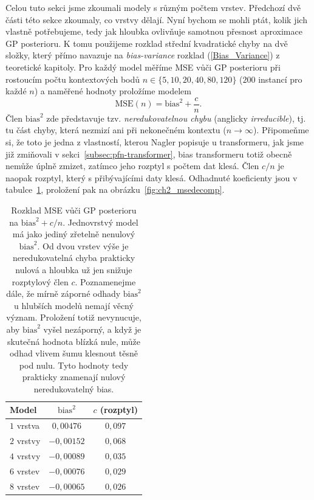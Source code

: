 Celou tuto sekci jsme zkoumali modely s různým počtem vrstev. 
Předchozí dvě části této sekce zkoumaly, co vrstvy dělají.
Nyní bychom se mohli ptát, kolik jich vlastně potřebujeme, tedy jak hloubka ovlivňuje samotnou přesnost aproximace GP posterioru.
K tomu použijeme rozklad střední kvadratické chyby na dvě složky, který přímo navazuje na \emph{bias-variance} rozklad (\ref{Bias_Variance}) z teoretické kapitoly.
Pro každý model měříme MSE vůči GP posterioru při rostoucím počtu kontextových bodů $n \in \{5, 10, 20, 40, 80, 120\}$ ($200$ instancí pro každé $n$) a naměřené hodnoty proložíme modelem
$$\text{MSE}(n) = \text{bias}^2 + \frac{c}{n}.$$
Člen $\text{bias}^2$ zde představuje tzv. \textit{neredukovatelnou chybu} (anglicky \emph{irreducible}), tj. tu část chyby, která nezmizí ani při nekonečném kontextu ($n \to \infty$).
Připomeňme si, že toto je jedna z vlastností, kterou Nagler popisuje u transformeru, jak jsme již zmiňovali v sekci~\ref{subsec:pfn-transformer}, bias transformeru totiž obecně nemůže úplně zmizet, zatímco jeho rozptyl s počtem dat klesá.
Člen $c/n$ je naopak rozptyl, který s přibývajícími daty klesá.
Odhadnuté koeficienty jsou v tabulce~\ref{tab:ch2_bias_variance}, proložení pak na obrázku~\ref{fig:ch2_msedecomp}.

\begin{table}[htbp]
\centering
\begin{tabular}{lcc}
\hline
Model & $\text{bias}^2$ & $c$ (rozptyl) \\
\hline
$1$ vrstva & $0{,}00476$ & $0{,}097$ \\
$2$ vrstvy & $-0{,}00152$ & $0{,}068$ \\
$4$ vrstvy & $-0{,}00089$ & $0{,}035$ \\
$6$ vrstev & $-0{,}00076$ & $0{,}029$ \\
$8$ vrstev & $-0{,}00065$ & $0{,}026$ \\
\hline
\end{tabular}
\caption{Rozklad MSE vůči GP posterioru na $\text{bias}^2 + c/n$. Jednovrstvý model má jako jediný zřetelně nenulový $\text{bias}^2$. Od dvou vrstev výše je neredukovatelná chyba prakticky nulová a hloubka už jen snižuje rozptylový člen $c$. Poznamenejme dále, že mírně záporné odhady $\text{bias}^2$ u hlubších modelů nemají věcný význam. Proložení totiž nevynucuje, aby $\text{bias}^2$ vyšel nezáporný, a když je skutečná hodnota blízká nule, může odhad vlivem šumu klesnout těsně pod nulu. Tyto hodnoty tedy prakticky znamenají nulový neredukovatelný bias.}
\label{tab:ch2_bias_variance}
\end{table}

